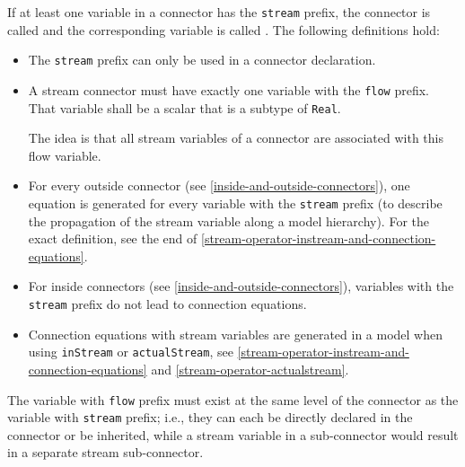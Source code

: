 If at least one variable in a connector has the \lstinline!stream! prefix, the connector is called  and the corresponding variable is called .
The following definitions hold:
\begin{itemize}
\item
  The \lstinline!stream! prefix can only be used in a connector declaration.
\item
  A stream connector must have exactly one variable with the \lstinline!flow! prefix.
  That variable shall be a scalar that is a subtype of \lstinline!Real!.
  \begin{nonnormative}
  The idea is that all stream variables of a connector are associated with this flow variable.
  \end{nonnormative}
\item
  For every outside connector (see \cref{inside-and-outside-connectors}), one equation is generated for every variable with the \lstinline!stream! prefix (to describe the propagation of the stream variable along a model hierarchy).
  For the exact definition, see the end of \cref{stream-operator-instream-and-connection-equations}.
\item
  For inside connectors (see \cref{inside-and-outside-connectors}), variables with the \lstinline!stream! prefix do not lead to connection equations.
\item
  Connection equations with stream variables are generated in a model when using \lstinline!inStream! or \lstinline!actualStream!, see \cref{stream-operator-instream-and-connection-equations} and \cref{stream-operator-actualstream}.
\end{itemize}
The variable with \lstinline!flow! prefix must exist at the same level of the connector as the variable with \lstinline!stream! prefix; i.e., they can each be directly declared in the connector or be inherited, while a stream variable in a sub-connector would result in a separate stream sub-connector.

